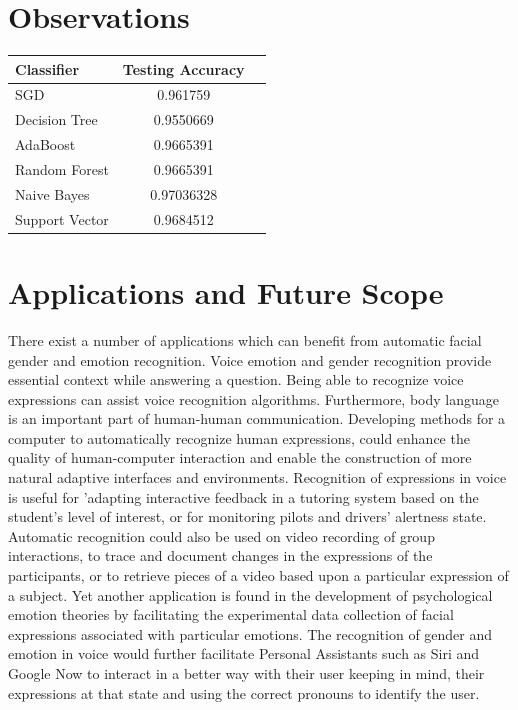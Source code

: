 \documentclass[12pt]{article}
\begin{document}
	\section{Observations}
	
		\begin{center}
			\begin{tabular}{ | l | c | r }
				\hline
				\textbf{Classifier} & \textbf{Testing Accuracy} \\ \hline
				SGD & 0.961759 \\ \hline
				Decision Tree & 0.9550669 \\ \hline
				AdaBoost & 0.9665391 \\ \hline
				Random Forest & 0.9665391 \\ \hline
				Naive Bayes & 0.97036328 \\ \hline
				Support Vector & 0.9684512 \\ \hline
			\end{tabular}
		\end{center}
	\section{Applications and Future Scope}
		There exist a number of applications which can benefit from automatic facial gender and emotion recognition. Voice emotion and gender recognition provide essential context while answering a question. Being able to recognize voice expressions can assist voice recognition algorithms. Furthermore, body language is an important part of human-human communication. Developing methods for a computer to automatically recognize human expressions, could enhance the quality of human-computer interaction and enable the construction of more natural adaptive interfaces and environments. Recognition of expressions in voice is useful for ’adapting interactive feedback in a tutoring system based on the student’s level of interest, or for monitoring pilots and drivers’ alertness state. Automatic recognition could also be used on video recording of group interactions, to trace and document changes in the expressions of the participants, or to retrieve pieces of a video based upon a particular expression of a subject. Yet another application is found in the development of psychological emotion theories by facilitating the experimental data collection of facial expressions associated with particular emotions. The recognition of gender and emotion in voice would further facilitate Personal Assistants such as Siri and Google Now to interact in a better way with their user keeping in mind, their expressions at that state and using the correct pronouns to identify the user. 
	\pagebreak
\end{document}
